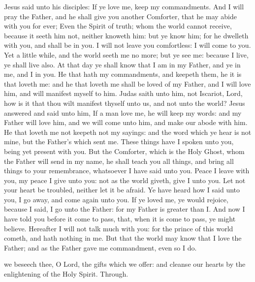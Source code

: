  Jesus said unto his disciples: If ye love me, keep my commandments. And I will pray the Father, and he shall give you another Comforter, that he may abide with you for ever; Even the Spirit of truth; whom the world cannot receive, because it seeth him not, neither knoweth him: but ye know him; for he dwelleth with you, and shall be in you. I will not leave you comfortless: I will come to you. Yet a little while, and the world seeth me no more; but ye see me: because I live, ye shall live also. At that day ye shall know that I am in my Father, and ye in me, and I in you. He that hath my commandments, and keepeth them, he it is that loveth me: and he that loveth me shall be loved of my Father, and I will love him, and will manifest myself to him. Judas saith unto him, not Iscariot, Lord, how is it that thou wilt manifest thyself unto us, and not unto the world? Jesus answered and said unto him, If a man love me, he will keep my words: and my Father will love him, and we will come unto him, and make our abode with him. He that loveth me not keepeth not my sayings: and the word which ye hear is not mine, but the Father's which sent me. These things have I spoken unto you, being yet present with you. But the Comforter, which is the Holy Ghost, whom the Father will send in my name, he shall teach you all things, and bring all things to your remembrance, whatsoever I have said unto you. Peace I leave with you, my peace I give unto you: not as the world giveth, give I unto you. Let not your heart be troubled, neither let it be afraid. Ye have heard how I said unto you, I go away, and come again unto you. If ye loved me, ye would rejoice, because I said, I go unto the Father: for my Father is greater than I. And now I have told you before it come to pass, that, when it is come to pass, ye might believe. Hereafter I will not talk much with you: for the prince of this world cometh, and hath nothing in me. But that the world may know that I love the Father; and as the Father gave me commandment, even so I do.


\secret
{} we beseech thee, O Lord, the gifts which we offer: and cleanse our hearts by the enlightening of the Holy Spirit. Through.



